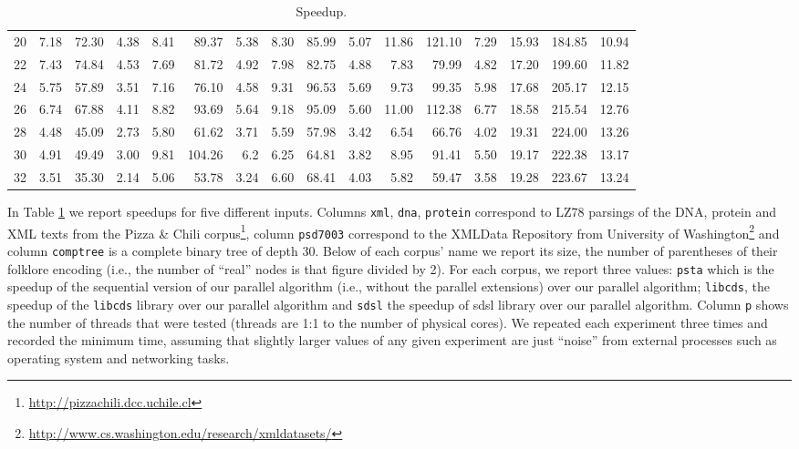 \begin{table}[ht]
\begin{tabular}{crrrrrrrrrrrrrrr}
 20  &  7.18 &  72.30 & 4.38 &  8.41 & 89.37  & 5.38 &  8.30  & 85.99  & 5.07 &  11.86 &  121.10 &  7.29  & 15.93 & 184.85 & 10.94\\
 22  &  7.43 &  74.84 & 4.53 &  7.69 & 81.72  & 4.92 &  7.98  & 82.75  & 4.88 &  7.83  &  79.99  &  4.82  & 17.20 & 199.60 & 11.82\\
 24  &  5.75 &  57.89 & 3.51 &  7.16 & 76.10  & 4.58 &  9.31  & 96.53  & 5.69 &  9.73  &  99.35  &  5.98  & 17.68 & 205.17 & 12.15\\
 26  &  6.74 &  67.88 & 4.11 &  8.82 & 93.69  & 5.64 &  9.18  & 95.09  & 5.60 &  11.00 &  112.38 &  6.77  & 18.58 & 215.54 & 12.76\\
 28  &  4.48 &  45.09 & 2.73 &  5.80 & 61.62  & 3.71 &  5.59  & 57.98  & 3.42 &  6.54  &  66.76  &  4.02  & 19.31 & 224.00 & 13.26\\
 30  &  4.91 &  49.49 & 3.00 &  9.81 & 104.26 & 6.2  &  6.25  & 64.81  & 3.82 &  8.95  &  91.41  &  5.50  & 19.17 & 222.38 & 13.17\\
 32  &  3.51 &  35.30 & 2.14 &  5.06 & 53.78  & 3.24 &  6.60  & 68.41  & 4.03 &  5.82  &  59.47  &  3.58  & 19.28 & 223.67 & 13.24\\
 \hline
\end{tabular}
\caption{Speedup.}
\label{tbl:speedup}
\end{table}


In Table \ref{tbl:speedup} we report speedups for five different
inputs. Columns \verb+xml+, \verb+dna+, \verb+protein+ correspond to
LZ78 parsings of the DNA, protein and XML texts from the Pizza \&
Chili corpus\footnote{\url{http://pizzachili.dcc.uchile.cl}}, column
\verb+psd7003+ correspond to the XMLData Repository from University of
Washington\footnote{\url{http://www.cs.washington.edu/research/xmldatasets/}}
and column \verb+comptree+ is a complete binary tree of depth
30. Below of each corpus' name we report its size, the number of
parentheses of their folklore encoding (i.e., the number of ``real''
nodes is that figure divided by 2). For each corpus, we report three
values: \verb+psta+ which is the speedup of the sequential version of
our parallel algorithm (i.e., without the parallel extensions) over
our parallel algorithm; \verb+libcds+, the speedup of the
\verb+libcds+ library over our parallel algorithm and \verb+sdsl+ the
speedup of sdsl library over our parallel algorithm. Column \verb+p+
shows the number of threads that were tested (threads are 1:1 to the
number of physical cores). We repeated each experiment three times and
recorded the minimum time, assuming that slightly larger values of any
given experiment are just ``noise'' from external processes such as
operating system and networking tasks.


